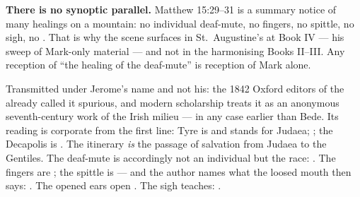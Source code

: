 \textbf{There is no synoptic parallel.} Matthew 15:29--31 is a summary notice
of many healings on a mountain: no individual deaf-mute, no fingers, no
spittle, no sigh, no . That is why the scene surfaces in
St.~Augustine's  at Book IV --- his sweep of
Mark-only material --- and not in the harmonising Books II--III. Any reception
of ``the healing of the deaf-mute'' is reception of Mark alone.

\begin{witnessnote}
Transmitted under Jerome's name and not his: the 1842 Oxford editors of the
 already called it spurious, and modern scholarship treats it as
an anonymous seventh-century work of the Irish milieu --- in any case earlier
than Bede. Its reading is corporate from the first line: Tyre is
 and stands for Judaea; ; the Decapolis is
. The itinerary \textit{is} the passage of salvation
from Judaea to the Gentiles. The deaf-mute is accordingly not an individual but
the race: . The fingers are
; the spittle is  --- and the author names what the loosed
mouth then says: . The opened ears
open . The sigh teaches: .
\end{witnessnote}

